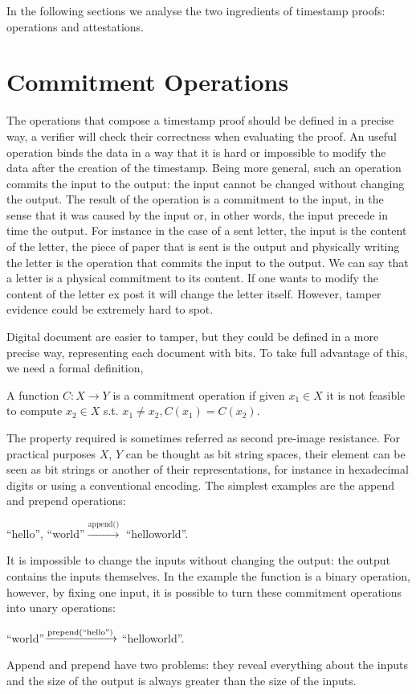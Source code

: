 In the following sections we analyse the two ingredients of timestamp proofs: operations and attestations.

\section{Commitment Operations}

The operations that compose a timestamp proof should be defined in a precise way, a verifier will check their correctness when evaluating the proof. An useful operation binds the data in a way that it is hard or impossible to modify the data after the creation of the timestamp. Being more general, such an operation commits the input to the output: the input cannot be changed without changing the output. The result of the operation is a commitment to the input, in the sense that it was caused by the input or, in other words, the input precede in time the output.
For instance in the case of a sent letter, the input is the content of the letter, the piece of paper that is sent is the output and physically writing the letter is the operation that commits the input to the output. We can say that a letter is a physical commitment to its content. If one wants to modify the content of the letter ex post it will change the letter itself. However, tamper evidence could be extremely hard to spot.

Digital document are easier to tamper, but they could be defined in a more precise way, representing each document with bits. To take full advantage of this, we need a formal definition,
\begin{mydef}
	A function $C:X \rightarrow Y$ is a commitment operation if given $x_1 \in X$ it is not feasible to compute $x_2 \in X$ s.t. $x_1 \neq x_2, C(x_1)=C(x_2)$.
\end{mydef}
The property required is sometimes referred as second pre-image resistance. For practical purposes $X$, $Y$ can be thought as bit string spaces, their element can be seen as bit strings or another of their representations, for instance in hexadecimal digits or using a conventional encoding.
The simplest examples are the append and prepend operations:

\begin{myexample}
	\textquotedblleft hello\textquotedblright, \textquotedblleft world\textquotedblright $\xrightarrow{\text{append()}}$ \textquotedblleft helloworld\textquotedblright.
\end{myexample}
It is impossible to change the inputs without changing the output: the output contains the inputs themselves.
In the example the function is a binary operation, however, by fixing one input, it is possible to turn these commitment operations into unary operations:
\begin{myexample}
	\textquotedblleft world\textquotedblright $\xrightarrow{\text{prepend(\textquotedblleft hello\textquotedblright)}}$ \textquotedblleft helloworld\textquotedblright.
\end{myexample}
Append and prepend have two problems: they reveal everything about the inputs and the size of the output is always greater than the size of the inputs. 

